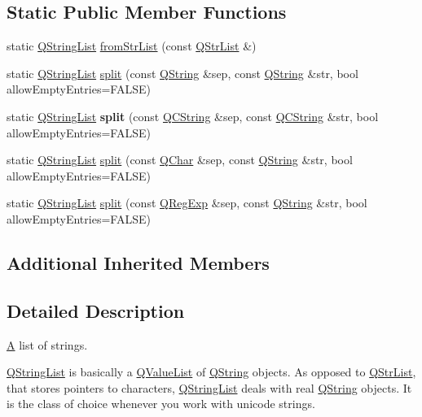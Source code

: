 \subsection*{Static Public Member Functions}
\begin{DoxyCompactItemize}
\item 
static \mbox{\hyperlink{class_q_string_list}{Q\+String\+List}} \mbox{\hyperlink{class_q_string_list_a8afc2284556889d4ab1930626b55f8a2}{from\+Str\+List}} (const \mbox{\hyperlink{class_q_str_list}{Q\+Str\+List}} \&)
\item 
static \mbox{\hyperlink{class_q_string_list}{Q\+String\+List}} \mbox{\hyperlink{class_q_string_list_a2c21b167a54aa8a8082996d7f18ca5bd}{split}} (const \mbox{\hyperlink{class_q_string}{Q\+String}} \&sep, const \mbox{\hyperlink{class_q_string}{Q\+String}} \&str, bool allow\+Empty\+Entries=F\+A\+L\+SE)
\item 
\mbox{\label{class_q_string_list_aa77dd3d336a00364cc748851d9b52398}} 
static \mbox{\hyperlink{class_q_string_list}{Q\+String\+List}} {\bfseries split} (const \mbox{\hyperlink{class_q_c_string}{Q\+C\+String}} \&sep, const \mbox{\hyperlink{class_q_c_string}{Q\+C\+String}} \&str, bool allow\+Empty\+Entries=F\+A\+L\+SE)
\item 
static \mbox{\hyperlink{class_q_string_list}{Q\+String\+List}} \mbox{\hyperlink{class_q_string_list_a57bbbd781091ae194b64138970497a87}{split}} (const \mbox{\hyperlink{class_q_char}{Q\+Char}} \&sep, const \mbox{\hyperlink{class_q_string}{Q\+String}} \&str, bool allow\+Empty\+Entries=F\+A\+L\+SE)
\item 
static \mbox{\hyperlink{class_q_string_list}{Q\+String\+List}} \mbox{\hyperlink{class_q_string_list_a9392a3dfe579b24ee51cd4bd754801e1}{split}} (const \mbox{\hyperlink{class_q_reg_exp}{Q\+Reg\+Exp}} \&sep, const \mbox{\hyperlink{class_q_string}{Q\+String}} \&str, bool allow\+Empty\+Entries=F\+A\+L\+SE)
\end{DoxyCompactItemize}
\subsection*{Additional Inherited Members}


\subsection{Detailed Description}
\mbox{\hyperlink{class_a}{A}} list of strings. 

\mbox{\hyperlink{class_q_string_list}{Q\+String\+List}} is basically a \mbox{\hyperlink{class_q_value_list}{Q\+Value\+List}} of \mbox{\hyperlink{class_q_string}{Q\+String}} objects. As opposed to \mbox{\hyperlink{class_q_str_list}{Q\+Str\+List}}, that stores pointers to characters, \mbox{\hyperlink{class_q_string_list}{Q\+String\+List}} deals with real \mbox{\hyperlink{class_q_string}{Q\+String}} objects. It is the class of choice whenever you work with unicode strings.

